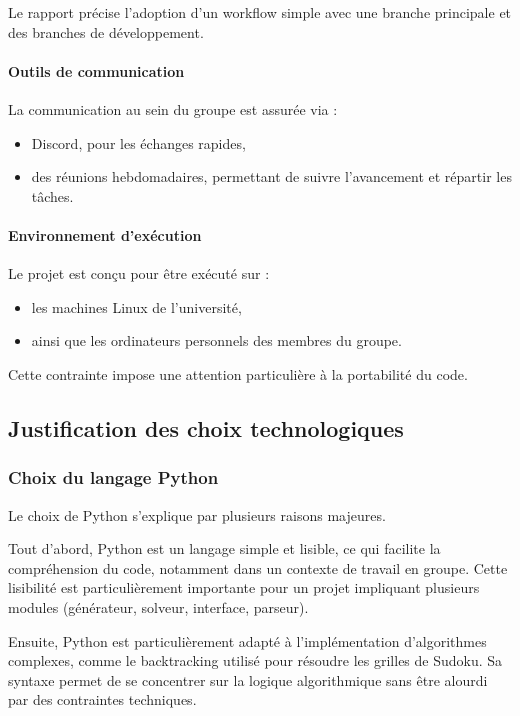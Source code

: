 \documentclass[a4paper]{article}
\begin{document}
Le rapport précise l’adoption d’un workflow simple avec une branche principale et des branches de développement.

\paragraph{Outils de communication}

La communication au sein du groupe est assurée via :
\begin{itemize}
    \item Discord, pour les échanges rapides,
    \item des réunions hebdomadaires, permettant de suivre l’avancement et répartir les tâches.
\end{itemize}

\paragraph{Environnement d’exécution}

Le projet est conçu pour être exécuté sur :
\begin{itemize}
    \item les machines Linux de l’université,
    \item ainsi que les ordinateurs personnels des membres du groupe.
\end{itemize}

Cette contrainte impose une attention particulière à la portabilité du code.

\subsection{Justification des choix technologiques}

\subsubsection{Choix du langage Python}

Le choix de Python s’explique par plusieurs raisons majeures.

Tout d’abord, Python est un langage simple et lisible, ce qui facilite la compréhension du code, notamment dans un contexte de travail en groupe. Cette lisibilité est particulièrement importante pour un projet impliquant plusieurs modules (générateur, solveur, interface, parseur).

Ensuite, Python est particulièrement adapté à l’implémentation d’algorithmes complexes, comme le backtracking utilisé pour résoudre les grilles de Sudoku. Sa syntaxe permet de se concentrer sur la logique algorithmique sans être alourdi par des contraintes techniques.
\end{document}
